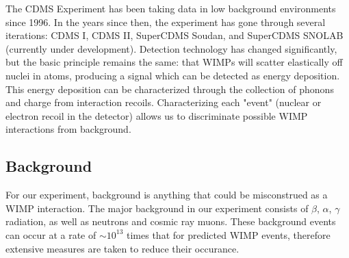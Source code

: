 \documentclass{report}
\begin{document}
The CDMS Experiment has been taking data in low background environments since 1996. In the years since then, the experiment has gone through several iterations: CDMS I, CDMS II, SuperCDMS Soudan, and SuperCDMS SNOLAB (currently under development). Detection technology has changed significantly, but the basic principle remains the same: that WIMPs will scatter elastically off nuclei in atoms, producing a signal which can be detected as energy deposition. This energy deposition can be characterized through the collection of phonons and charge from interaction recoils. Characterizing each "event" (nuclear or electron recoil in the detector) allows us to discriminate possible WIMP interactions from background.

\subsection{Background}

For our experiment, background is anything that could be misconstrued as a WIMP interaction. The major background in our experiment consists of $\beta$, $\alpha$, $\gamma$ radiation, as well as neutrons and cosmic ray muons. These background events can occur at a rate of $ \sim 10^{13}$ times that for predicted WIMP events, therefore extensive measures are taken to reduce their occurance.
\end{document}
